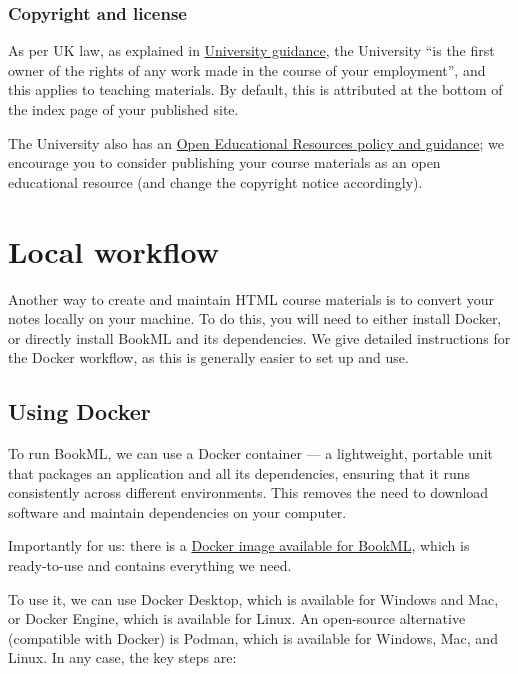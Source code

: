 \subsubsection*{Copyright and license}
\label{ssec:pub:license}

As per UK law, as explained in \href{https://library.ed.ac.uk/library-help/copyright/copyright-teaching}{University guidance}, the University ``is the first owner of the rights of any work made in the course of your employment'', and this applies to teaching materials. By default, this is attributed at the bottom of the index page of your published site.

The University also has an \href{https://open.ed.ac.uk/how-to-guides/}{Open Educational Resources policy and guidance}; we encourage you to consider publishing your course materials as an open educational resource (and change the copyright notice accordingly).


\section{Local workflow}

Another way to create and maintain HTML course materials is to convert your notes locally on your machine. To do this, you will need to either install Docker, or directly install BookML and its dependencies. We give detailed instructions for the Docker workflow, as this is generally easier to set up and use.

\subsection{Using Docker}
\label{ssec:docker}

To run BookML, we can use a Docker container --- a lightweight, portable unit that packages an application and all its dependencies, ensuring that it runs consistently across different environments. This removes the need to download software and maintain dependencies on your computer.

Importantly for us: there is a \href{https://github.com/vlmantova/bookml/pkgs/container/bookml}{Docker image available for BookML}, which is ready-to-use and contains everything we need.

To use it, we can use Docker Desktop, which is available for Windows and Mac, or Docker Engine, which is available for Linux. An open-source alternative (compatible with Docker) is Podman, which is available for Windows, Mac, and Linux. In any case, the key steps are:

